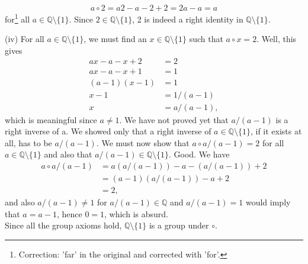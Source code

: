 \documentclass{amsbook}
\author{Murat Buldu}
\begin{document}
\[  a \circ 2 = a2 - a - 2 + 2 = 2a - a = a \]
for\footnote{ Correction: 'far' in the original and corrected with 'for'. } all \( a \in \mathbb{Q} \setminus \{1\} \). Since \(2 \in \mathbb{Q} \setminus \{1\} \), 2 is indeed a right identity in \( \mathbb{Q} \setminus \{1\} \).
\begin{hEnumerateAlpha}
    \item[(iv)]
        For all \( a \in \mathbb{Q} \setminus \{1\} \), we must find an \( x \in \mathbb{Q} \setminus \{1\} \) such that \( a \circ x = 2 \). Well, this gives 
        \begin{align*}
            ax - a - x + 2 &= 2 \\
            ax - a - x + 1 &= 1 \\
            (a - 1)(x - 1) &= 1 \\
            x - 1 &= 1/(a - 1) \\
            x &= a/(a - 1),
        \end{align*}
        which is meaningful since \( a \neq 1 \). We have not proved yet that \( a/(a-1) \) is a right inverse of a. We showed only that a right inverse of \( a \in \mathbb{Q} \setminus \{1\} \), if it exists at all, has to be \( a/(a-1) \). We must now show that \( a \circ a/(a-1) = 2 \) for all \( a \in \mathbb{Q} \setminus \{1\} \) and also that \( a/(a - 1) \in \mathbb{Q} \setminus \{1\} \). Good. We have 
        \begin{align*}
            a \circ a/(a-1) &= a(a/(a-1)) - a - (a/(a-1)) + 2 \\
            &= (a - 1)(a/(a-1)) - a + 2 \\
            &= 2, 
        \end{align*}
        and also \( a/(a - 1) \neq 1 \) for \( a/(a - 1) \in \mathbb{Q} \) and \( a/(a - 1) = 1 \) would imply that \( a = a - 1 \), hence \( 0 = 1 \), which is absurd. \\
        Since all the group axioms hold, \( \mathbb{Q} \setminus \{1\} \) is a group under \( \circ  \).\\
\end{hEnumerateAlpha}
\end{document}

